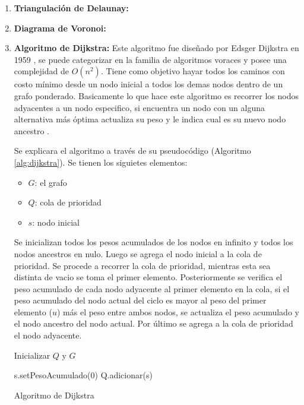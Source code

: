 \documentclass[11pt,twoside,A5]{article}
\begin{document}
\begin{enumerate}
\item \textbf{Triangulación de Delaunay:}
\item \textbf{Diagrama de Voronoi:}
\item \textbf{Algoritmo de Dijkstra:} Este algoritmo fue diseñado por Edsger Dijkstra en 1959 \cite{sniedovich2006,lavalle2006,cormen2001}, se puede categorizar en la familia de algoritmos voraces y posee una complejidad de $O(n^{2})$. Tiene como objetivo hayar todos los caminos con costo mínimo desde un nodo inicial a todos los demas nodos dentro de un grafo ponderado. Basicamente lo que hace este algoritmo es recorrer los nodos adyacentes a un nodo especifico, si encuentra un nodo con un alguna alternativa más óptima
actualiza su peso y le indica cual es su nuevo nodo ancestro .

Se explicara el algoritmo a través de su pseudocódigo (Algoritmo \ref{alg:dijkstra}).
Se tienen los siguietes elementos:

\begin{itemize}
\item $G$: el grafo
\item $Q$: cola de prioridad
\item $s$: nodo inicial
\end{itemize}

Se inicializan todos los pesos acumulados de los nodos en infinito y todos los nodos ancestros en nulo. 
Luego se agrega el nodo inicial a la cola de prioridad. 
Se procede a recorrer la cola de prioridad, mientras esta sea distinta de vacio se toma el primer elemento. 
Posteriormente se verifica el peso acumulado de cada nodo adyacente al primer elemento en la cola, si el peso acumulado del nodo actual del ciclo es mayor
al peso del primer elemento ($u$) más el peso entre ambos nodos, se actualiza el peso acumulado y el nodo ancestro del nodo actual.
Por último se agrega a la cola de prioridad el nodo adyacente. 

\begin{algorithm}
\DontPrintSemicolon
{}

Inicializar $Q$ y $G$\;


s.setPesoAcumulado(0)\;
Q.adicionar(s)\;


\caption{Algoritmo de Dijkstra \label{alg:dijkstra}}
\end{algorithm}


\end{enumerate}
\end{document}
